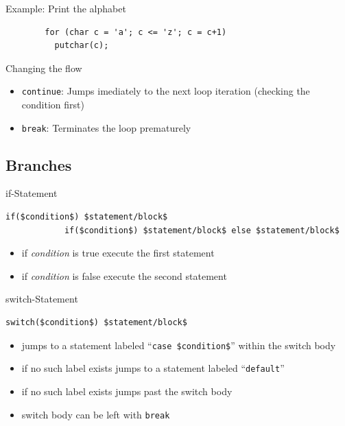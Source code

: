 \documentclass[english,compress]{beamer}
\begin{document}
\begin{frame}[fragile]{Example: Print the alphabet}
	\begin{lstlisting}
		for (char c = 'a'; c <= 'z'; c = c+1)
		  putchar(c);
	\end{lstlisting}
\end{frame}

\begin{frame}{Changing the flow}
	\begin{itemize}
		\item \lstinline|continue|: Jumps imediately to the next loop iteration (checking the condition first)
		\item \lstinline|break|: Terminates the loop prematurely
	\end{itemize}
\end{frame}

\subsection{Branches}
\begin{frame}[fragile]
	\begin{block}{if-Statement}
		\begin{lstlisting}[numbers=none]
			if($condition$) $statement/block$
			if($condition$) $statement/block$ else $statement/block$
		\end{lstlisting}
		\begin{itemize}
			\item if \textit{condition} is true execute the first statement
			\item if \textit{condition} is false execute the second statement

		\end{itemize}
	\end{block}
\end{frame}

\begin{frame}[fragile]
	\begin{block}{switch-Statement}
		\begin{lstlisting}[numbers=none]
			switch($condition$) $statement/block$
		\end{lstlisting}
		\begin{itemize}
			\item jumps to a statement labeled ``\lstinline|case $condition$|'' within the switch body
			\item if no such label exists jumps to a statement labeled ``\lstinline|default|''
			\item if no such label exists jumps past the switch body
			\item switch body can be left with \lstinline|break|
		\end{itemize}
	\end{block}
\end{frame}
\end{document}
